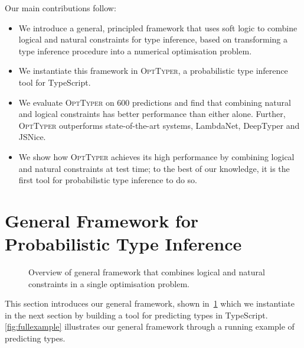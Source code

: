 \documentclass[acmsmall, review, anonymous]{acmart}\settopmatter{printfolios=true,printccs=false,printacmref=false}
\newcommand{\projectname}{\textsc{OptTyper}\xspace}
\begin{document}
	
Our main contributions follow:
\begin{itemize}[label=\raisebox{0.25ex}{\tiny$\bullet$}]
	\item We introduce a general, principled framework that uses soft logic to combine logical and natural constraints for type inference,
	      based on transforming a type inference procedure into a numerical optimisation problem.
	\item We instantiate this framework in \projectname, a probabilistic type inference tool for TypeScript.
	\item We evaluate \projectname  {} on $600$ predictions and find that combining natural and logical constraints has better performance than either alone. Further, \projectname outperforms state-of-the-art systems,
	      LambdaNet, DeepTyper and JSNice.
	\item We show how \projectname achieves its high performance by combining logical and natural constraints at test time; to the best of our knowledge, it is the first tool for probabilistic type inference to do so.
\end{itemize}

%
\section{General Framework for Probabilistic Type Inference} \label{sec:framework}
\begin{figure}[!t]
    \centering
    \def\svgwidth{\linewidth}
    
    \caption{Overview of general framework that combines logical
    and natural constraints in a single optimisation problem.} \label{fig:overview}
\end{figure}
This section introduces our general framework, shown in~\cref{fig:overview}
which we instantiate in the next section by building a tool for
predicting types in TypeScript.
\cref{fig:fullexample} illustrates our general framework through a running example of predicting types. 
\end{document}

